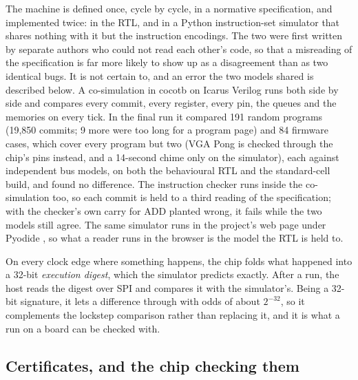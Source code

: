 \documentclass[conference,letterpaper]{IEEEtran}
\begin{document}
The machine is defined once, cycle by cycle, in a normative specification, and
implemented twice: in the RTL, and in a Python instruction-set simulator that shares
nothing with it but the instruction encodings. The two were first written by separate
authors who could not read each other's code, so that a misreading of the specification
is far more likely to show up as a disagreement than as two identical bugs. It is not
certain to, and an error the two models shared is described below. A co-simulation in
cocotb \cite{cocotb} on Icarus Verilog \cite{iverilog} runs both side by side and
compares every commit, every register, every pin, the queues and the memories on every
tick. In the final run it compared 191 random programs (19,850 commits; 9 more were too long for a program page) and 84 firmware cases, which cover every program but two (VGA Pong is checked through the chip's pins instead, and a 14-second chime only on the simulator), each against independent bus models, on both the behavioural RTL and the standard-cell build, and found no difference. The instruction checker runs inside the co-simulation too, so each commit is held to a third reading of the specification; with the checker's own carry for ADD planted wrong, it fails while the two models still agree. The same simulator runs in the project's web page under Pyodide
\cite{pyodide}, so what a reader runs in the browser is the model the RTL is held to.

On every clock edge where something happens, the chip folds what happened into a 32-bit
\emph{execution digest}, which the simulator predicts exactly. After a run, the host
reads the digest over SPI and compares it with the simulator's. Being a 32-bit signature,
it lets a difference through with odds of about $2^{-32}$, so it complements the lockstep
comparison rather than replacing it, and it is what a run on a board can be checked with.

\subsection{Certificates, and the chip checking them}
\end{document}
